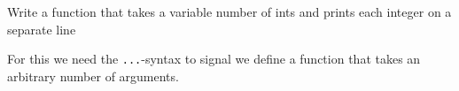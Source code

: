 \begin{Exercise}[title={Var args},difficulty=1]
\label{ex:varargs}
\Question\label{ex:varargs q1}
Write a function that takes a variable number of ints and prints
each integer on a separate line
\end{Exercise}

\begin{Answer}
\Question
For this we need the \lstinline{...}-syntax to signal we define a
function that takes an arbitrary number of arguments. 



\end{Answer}
